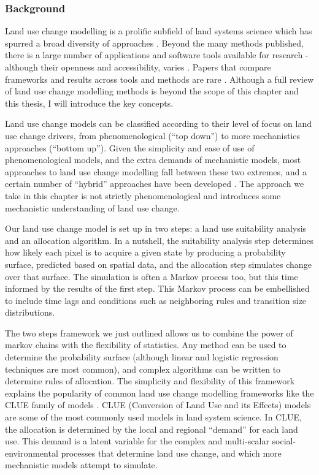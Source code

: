 \subsubsection{Background}

Land use change modelling is a prolific subfield of land systems science which has spurred a broad diversity of approaches \citep{dang_review_2016, noszczyk_review_2018}. Beyond the many methods published, there is a large number of applications and software tools available for research  - although their openness and accessibility, varies \citep{moulds_open_2015}. Papers that compare frameworks and results across tools and methods are rare \citep{pontius_comparing_2008, pontius_comparison_2005, sun_comparison_2018}. Although a full review of land use change modelling methods is beyond the scope of this chapter and this thesis, I will introduce the key concepts.

Land use change models can be classified according to their level of focus on land use change drivers, from phenomenological (“top down”) to more mechanistics approaches (“bottom up”). Given the simplicity and ease of use of phenomenological models, and the extra demands of mechanistic models, most approaches to land use change modelling fall between these two extremes, and a certain number of “hybrid” approaches have been developed \citep{sun_comparison_2018, jokar_arsanjani_integration_2013}. The approach we take in this chapter is not strictly phenomenological and introduces  some mechanistic understanding of land use change.

Our land use change model is set up in two steps: a land use suitability analysis and an allocation algorithm. In a nutshell, the suitability analysis step determines how likely each pixel is to acquire a given state by producing a probability surface, predicted based on spatial data, and the allocation step simulates change over that surface. The simulation is often a Markov process too, but this time informed by the results of the first step. This Markov process can be embellished to include time lags and conditions such as neighboring rules and transition size distributions.

The two steps framework we just outlined allows us to combine the power of markov chains with the flexibility of statistics. Any method can be used to determine the probability surface (although linear and logistic regression techniques are most common), and complex algorithms can be written to determine rules of allocation. The simplicity and flexibility of this framework explains the popularity of common land use change modelling frameworks like the CLUE family of models \citep{verburg_modeling_2002, verburg_combining_2009}. CLUE (Conversion of Land Use and its Effects) models are some of the most commonly used models in land system science. In CLUE, the allocation is determined by the local and regional “demand” for each land use. This demand is a latent variable for the complex and multi-scalar social-environmental processes that determine land use change, and which more mechanistic models attempt to simulate.


